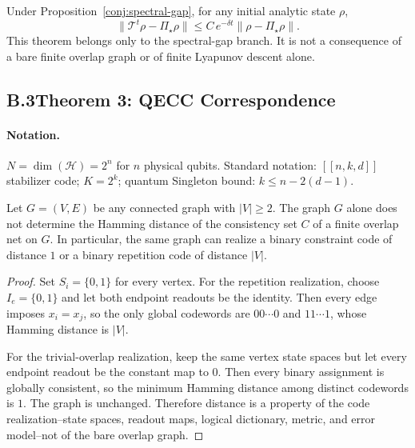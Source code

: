 \begin{theorem}
\label{thm:exp-convergence}
Under Proposition~\ref{conj:spectral-gap}, for any initial analytic state \(\rho\),
\[
  \bigl\|\mathcal T^t\rho-\Pi_\star\rho\bigr\|
  \leq C\,e^{-\delta t}\bigl\|\rho-\Pi_\star\rho\bigr\|.
\]
This theorem belongs only to the spectral-gap branch. It is not a consequence of a bare finite
overlap graph or of finite Lyapunov descent alone.
\end{theorem}

\subsection*{B.3\quad Theorem 3: QECC Correspondence}

\paragraph{Notation.}
$N=\dim(\mathcal{H})=2^n$ for $n$ physical qubits.
Standard notation: $[[n,k,d]]$ stabilizer code; $K=2^k$; quantum
Singleton bound: $k\leq n-2(d-1)$.

\begin{theorem}
\label{thm:no-free-mincut}
Let \(G=(V,E)\) be any connected graph with \(|V|\ge2\). The graph \(G\) alone does not determine
the Hamming distance of the consistency set \(C\) of a finite overlap net on \(G\). In particular,
the same graph can realize a binary constraint code of distance \(1\) or a binary repetition code
of distance \(|V|\).
\end{theorem}

\begin{proof}
Set \(S_i=\{0,1\}\) for every vertex. For the repetition realization, choose \(I_e=\{0,1\}\) and
let both endpoint readouts be the identity. Then every edge imposes \(x_i=x_j\), so the only
global codewords are \(00\cdots0\) and \(11\cdots1\), whose Hamming distance is \(|V|\).

For the trivial-overlap realization, keep the same vertex state spaces but let every endpoint
readout be the constant map to \(0\). Then every binary assignment is globally consistent, so the
minimum Hamming distance among distinct codewords is \(1\). The graph is unchanged. Therefore
distance is a property of the code realization--state spaces, readout maps, logical dictionary,
metric, and error model--not of the bare overlap graph.
\end{proof}

